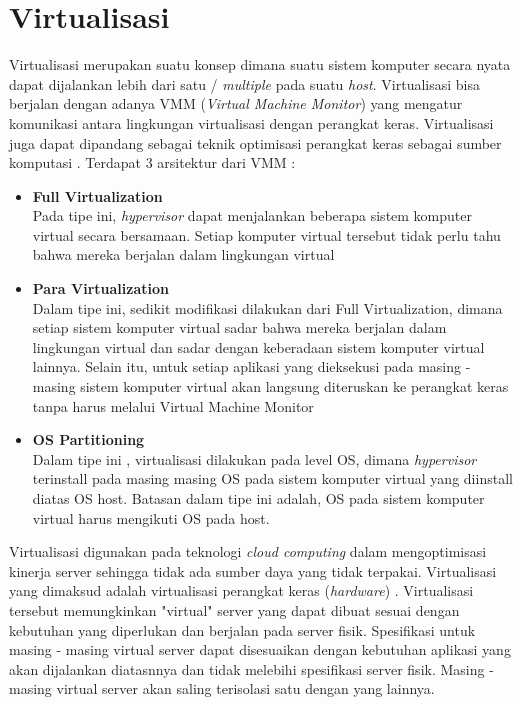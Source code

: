 \section{Virtualisasi}
\hspace{0.5cm}Virtualisasi merupakan suatu konsep dimana suatu sistem komputer secara nyata dapat dijalankan lebih dari satu / \textit{multiple} pada suatu \textit{host}. Virtualisasi bisa berjalan dengan adanya VMM (\textit{Virtual Machine Monitor}) yang mengatur komunikasi antara lingkungan virtualisasi dengan perangkat keras. Virtualisasi juga dapat dipandang sebagai teknik optimisasi perangkat keras sebagai sumber komputasi \cite{vmm}. Terdapat 3 arsitektur dari VMM :
\begin{itemize}
	\item \textbf{Full Virtualization} \\ Pada tipe ini, \textit{hypervisor} dapat menjalankan beberapa sistem komputer virtual secara bersamaan. Setiap komputer virtual tersebut tidak perlu tahu bahwa mereka berjalan dalam lingkungan virtual
	\item \textbf{Para Virtualization} \\ Dalam tipe ini, sedikit modifikasi dilakukan dari Full Virtualization, dimana setiap sistem komputer virtual sadar bahwa mereka berjalan dalam lingkungan virtual dan sadar dengan keberadaan sistem komputer virtual lainnya. Selain itu, untuk setiap aplikasi yang dieksekusi pada masing - masing sistem komputer virtual akan langsung diteruskan ke perangkat keras tanpa harus melalui Virtual Machine Monitor
	\item \textbf{OS Partitioning} \\ Dalam tipe ini , virtualisasi dilakukan pada level OS, dimana \textit{hypervisor} terinstall pada masing masing OS pada sistem komputer virtual yang diinstall diatas OS host. Batasan dalam tipe ini adalah, OS pada sistem komputer virtual harus mengikuti OS pada host.
\end{itemize}

   
\hspace{0.5cm}Virtualisasi digunakan pada teknologi \textit{cloud computing} dalam mengoptimisasi kinerja server sehingga tidak ada sumber daya yang tidak terpakai. Virtualisasi yang dimaksud adalah virtualisasi perangkat keras (\textit{hardware}) \cite{Virtualization in Education}. Virtualisasi tersebut  memungkinkan "virtual" server yang dapat dibuat sesuai dengan kebutuhan yang diperlukan dan berjalan pada server fisik. Spesifikasi untuk masing - masing virtual server dapat disesuaikan dengan kebutuhan aplikasi yang akan dijalankan diatasnnya dan tidak melebihi spesifikasi server fisik. Masing - masing virtual server akan saling terisolasi satu dengan yang lainnya. 

